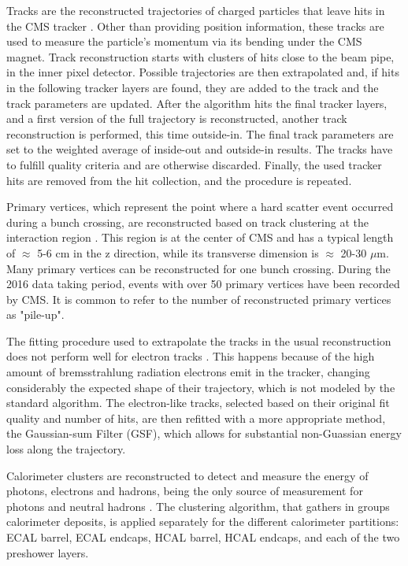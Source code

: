 Tracks are the reconstructed trajectories of charged particles that leave hits in the CMS tracker \cite{cms_track}. 
Other than providing position information, these tracks are used to measure the particle's momentum via its bending under the CMS magnet. 
Track reconstruction starts with clusters of hits close to the beam pipe, in the inner pixel detector. 
Possible trajectories are then extrapolated and, if hits in the following tracker layers are found, they are added to the track and the track parameters are updated. 
After the algorithm hits the final tracker layers, and a first version of the full trajectory is reconstructed, another track reconstruction is performed, this time outside-in. 
The final track parameters are set to the weighted average of inside-out and outside-in results. 
The tracks have to fulfill quality criteria and are otherwise discarded. 
Finally, the used tracker hits are removed from the hit collection, and the procedure is repeated.

Primary vertices, which represent the point where a hard scatter event occurred during a bunch crossing, are reconstructed based on track clustering at the interaction region \cite{cms_track}. 
This region is at the center of CMS and has a typical length of $\approx$ 5-6 cm in the z direction, while its transverse dimension is $\approx$ 20-30 $\mu$m. 
Many primary vertices can be reconstructed for one bunch crossing. 
During the 2016 data taking period, events with over 50 primary vertices have been recorded by CMS. 
It is common to refer to the number of reconstructed primary vertices as "pile-up".

The fitting procedure used to extrapolate the tracks in the usual reconstruction does not perform well for electron tracks \cite{cms_track}. 
This happens because of the high amount of bremsstrahlung radiation electrons emit in the tracker, changing considerably the expected shape of their trajectory, which is not modeled by the standard algorithm. 
The electron-like tracks, selected based on their original fit quality and number of hits, are then refitted with a more appropriate method, the Gaussian-sum Filter (GSF), which allows for substantial non-Guassian energy loss along the trajectory.

Calorimeter clusters are reconstructed to detect and measure the energy of photons, electrons and hadrons, being the only source of measurement for photons and neutral hadrons \cite{cms_pf}. 
The clustering algorithm, that gathers in groups calorimeter deposits, is applied separately for the different calorimeter partitions: ECAL barrel, ECAL endcaps, HCAL barrel, HCAL endcaps, and each of the two preshower layers. 

